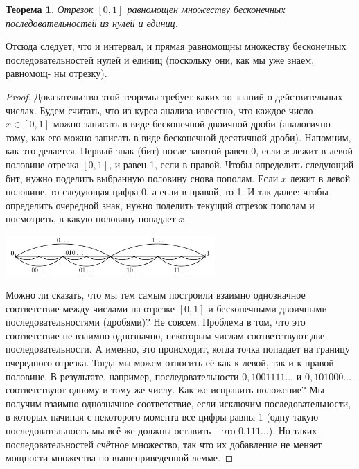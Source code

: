 \documentclass{article}
\newtheorem{theorem}{Теорема}
\begin{document}
\begin{theorem}
Отрезок $[0, 1]$ равномощен множеству бесконечных последовательностей из нулей и единиц.
\end{theorem}
Отсюда следует, что и интервал, и прямая равномощны множеству бесконечных последовательностей нулей и единиц (поскольку они, как мы уже знаем, равномощ- ны отрезку).
\begin{proof}
Доказательство этой теоремы требует каких-то знаний о действительных числах. Будем считать, что из курса анализа известно, что каждое число $x \in [0,1]$ можно записать в виде бесконечной двоичной дроби (аналогично тому, как его можно записать в виде бесконечной десятичной дроби). Напомним, как это делается. Первый знак (бит) после запятой равен 0, если $x$ лежит в левой половине отрезка $[0, 1]$, и равен 1, если в правой. Чтобы определить следующий бит, нужно поделить выбранную половину снова пополам. Если $x$ лежит в левой половине, то следующая цифра 0, а если в правой, то 1. И так далее: чтобы определить очередной знак, нужно поделить текущий отрезок пополам и посмотреть, в какую половину попадает $x$.
\begin{center}
    \includegraphics[width=0.6\textwidth]{binary}
\end{center}
Можно ли сказать, что мы тем самым построили взаимно однозначное соответствие между числами на отрезке $[0, 1]$ и бесконечными двоичными последовательностями (дробями)? Не совсем. Проблема в том, что это соответствие не взаимно однозначно, некоторым числам соответствуют две последовательности. А именно, это происходит, когда точка попадает на границу очередного отрезка. Тогда мы можем относить её как к левой, так и к правой половине. В результате, например, последовательности $0,1001111...$ и $0,101000...$ соответствуют одному и тому же числу.
\newline
Как же исправить положение? Мы получим взаимно однозначное соответствие, если исключим последовательности, в которых начиная с некоторого момента все цифры равны 1 (одну такую последовательность мы всё же должны оставить – это $0.111...$). Но таких последовательностей счётное множество, так что их добавление не меняет мощности множества по вышеприведенной лемме.
\end{proof}
\end{document}
